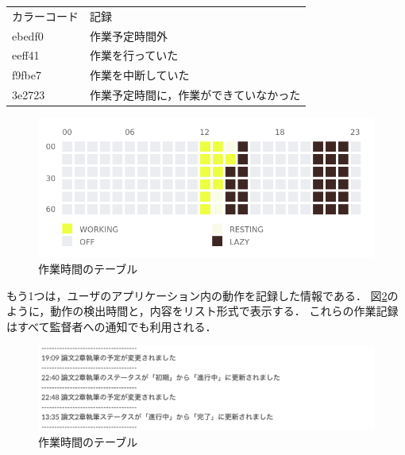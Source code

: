 \begin{table}[h]
  \begin{tabular}{ll}
    カラーコード & 記録 \\
    ebedf0 & 作業予定時間外 \\
    eeff41 & 作業を行っていた \\
    f9fbe7 & 作業を中断していた \\
    3e2723 & 作業予定時間に，作業ができていなかった \\
  \end{tabular}
\end{table}

\begin{figure}[h]
  \begin{center}
  \includegraphics[width=12.0cm]{graphics/activity_table.png}
  \caption{作業時間のテーブル}
  \label{fig:activity_table}
  \end{center}
\end{figure}

\clearpage

もう1つは，ユーザのアプリケーション内の動作を記録した情報である．
図\ref{fig:activity_log}のように，動作の検出時間と，内容をリスト形式で表示する．
これらの作業記録はすべて監督者への通知でも利用される．

\begin{figure}[h]
  \begin{center}
  \includegraphics[width=14.0cm]{graphics/activity_log.png}
  \caption{作業時間のテーブル}
  \label{fig:activity_log}
  \end{center}
\end{figure}


